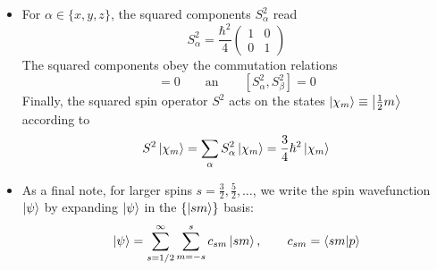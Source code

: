 \documentclass[11pt, a4paper]{article}
\newcommand{\eqtext}[1]{\qquad \text{#1} \qquad}
\newcommand{\p}{\psi}  %
\begin{document}
\begin{itemize}
	
	\item For $ \alpha \in \{x, y, z\} $, the squared components $ S_{\alpha}^{2} $ read
	\begin{equation*}
		S_{\alpha}^{2} = \frac{\hbar^{2}}{4}
		\begin{pmatrix}
			1 & 0\\
			0 & 1
		\end{pmatrix}
	\end{equation*}
	The squared components obey the commutation relations
	\begin{equation*}
		[S_{\alpha}, S_{\beta}^{2}] = 0 \eqtext{an} [S_{\alpha}^{2}, S_{\beta}^{2}] = 0
	\end{equation*}
	Finally, the squared spin operator $ S^{2} $ acts on the states $ \ket{\chi_{m}} \equiv \ket{\tfrac{1}{2}m} $ according to
	\begin{equation*}
		S^{2}\ket{\chi_{m}} = \sum_{\alpha}S_{\alpha}^{2} \ket{\chi_{m}} = \frac{3}{4}\hbar^{2} \ket{\chi_{m}}
	\end{equation*}
	
	\item As a final note, for larger spins $ s = \frac{3}{2}, \frac{5}{2}, \ldots $, we write the spin wavefunction $ \ket{\p} $ by expanding $ \ket{\p} $ in the $ \{\ket{sm}\} $ basis:
	\begin{equation*}
		\ket{\p} = \sum_{s = 1/2}^{\infty}\sum_{m = -s}^{s}c_{sm}\ket{sm}, \qquad c_{sm} = \braket{sm}{p}
	\end{equation*}
	
\end{itemize}
\end{document}
